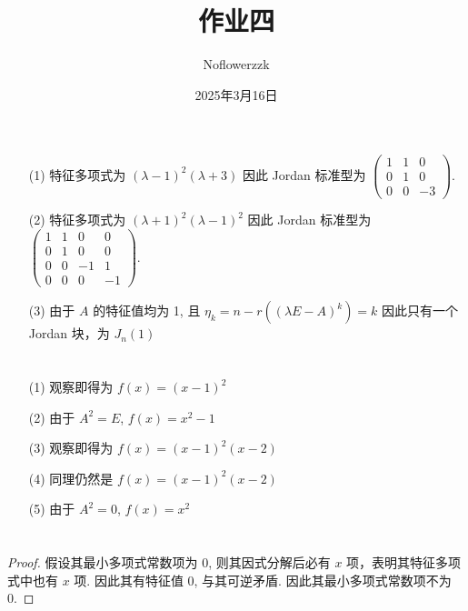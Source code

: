 \documentclass{article}
\title{作业四}
\author{Noflowerzzk}
\date{2025年3月16日}
\begin{document}
\maketitle

\section{}

\begin{itemize}
    \item [(1)] 特征多项式为 $(\lambda - 1)^2(\lambda + 3)$ 因此 Jordan 标准型为 $\begin{pmatrix} 1 & 1 & 0 \\ 0 & 1 & 0 \\ 0 & 0 & -3 \end{pmatrix}$.
    \item [(2)] 特征多项式为 $(\lambda + 1)^2(\lambda - 1)^2$ 因此 Jordan 标准型为 $\begin{pmatrix} 1 & 1 & 0 & 0 \\ 0 & 1 & 0 & 0 \\ 0 & 0 & -1 & 1 \\ 0 & 0 & 0 & -1 \end{pmatrix}$.
    \item [(3)] 由于 $A$ 的特征值均为 1, 且 $\eta_k = n - r((\lambda E - A)^k) = k$ 因此只有一个 Jordan 块，为 $J_n(1)$
\end{itemize} 

\section{}

\begin{itemize}
    \item [(1)] 观察即得为 $f(x) = (x - 1)^2$
    \item [(2)] 由于 $A^2 = E$, $f(x) = x^2 - 1$
    \item [(3)] 观察即得为 $f(x) = (x - 1)^2(x - 2)$
    \item [(4)] 同理仍然是 $f(x) = (x - 1)^2(x - 2)$
    \item [(5)] 由于 $A^2 = 0$, $f(x) = x^2$
\end{itemize}

\section{}

\begin{proof}
    假设其最小多项式常数项为 0, 则其因式分解后必有 $x$ 项，表明其特征多项式中也有 $x$ 项. 因此其有特征值 0, 与其可逆矛盾. 因此其最小多项式常数项不为 0.
\end{proof}
\end{document}
